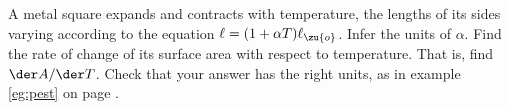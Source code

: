 A metal square expands and contracts with temperature, the lengths of its sides varying according to the
equation $\ell=(1+\alpha T)\ell_\zu{o}$. Infer the units of $\alpha$. Find the rate of change of its surface area with respect to
temperature. That is, find $\der A/\der T$.  
Check that your answer has the right units, as in example \ref{eg:pest} on page \pageref{eg:pest}.\answercheck
